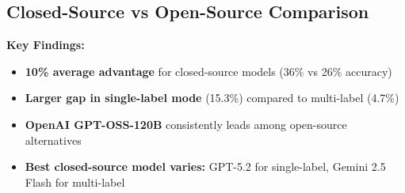 \documentclass[12pt,a4paper]{article}
\begin{document}


    
    
    

\subsection{Closed-Source vs Open-Source Comparison}

\textbf{Key Findings:}
\begin{itemize}[leftmargin=*]
    \item \textbf{10\% average advantage} for closed-source models (36\% vs 26\% accuracy)
    
    \item \textbf{Larger gap in single-label mode} (15.3\%) compared to multi-label (4.7\%)
    
    \item \textbf{OpenAI GPT-OSS-120B} consistently leads among open-source alternatives
    
    \item \textbf{Best closed-source model varies:} GPT-5.2 for single-label, Gemini 2.5 Flash for multi-label
\end{itemize}
\end{document}
